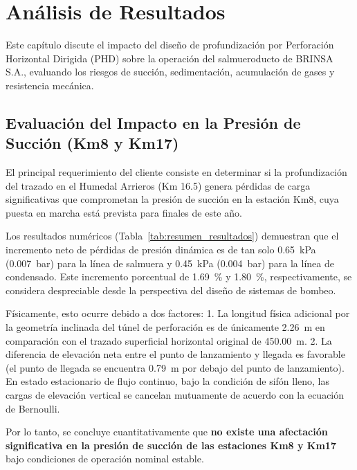 \section{Análisis de Resultados}
\label{sec:analisis}

Este capítulo discute el impacto del diseño de profundización por Perforación Horizontal Dirigida (PHD) sobre la operación del salmueroducto de BRINSA S.A., evaluando los riesgos de succión, sedimentación, acumulación de gases y resistencia mecánica.

\subsection{Evaluación del Impacto en la Presión de Succión (Km8 y Km17)}
\label{ssec:analisis_succion}

El principal requerimiento del cliente consiste en determinar si la profundización del trazado en el Humedal Arrieros (Km 16.5) genera pérdidas de carga significativas que comprometan la presión de succión en la estación Km8, cuya puesta en marcha está prevista para finales de este año.

Los resultados numéricos (Tabla~\ref{tab:resumen_resultados}) demuestran que el incremento neto de pérdidas de presión dinámica es de tan solo \SI{0.65}{\kilo\pascal} (\SI{0.007}{bar}) para la línea de salmuera y \SI{0.45}{\kilo\pascal} (\SI{0.004}{bar}) para la línea de condensado. Este incremento porcentual de \SI{1.69}{\percent} y \SI{1.80}{\percent}, respectivamente, se considera despreciable desde la perspectiva del diseño de sistemas de bombeo. 

Físicamente, esto ocurre debido a dos factores:
1. La longitud física adicional por la geometría inclinada del túnel de perforación es de únicamente \SI{2.26}{\meter} en comparación con el trazado superficial horizontal original de \SI{450.00}{\meter}.
2. La diferencia de elevación neta entre el punto de lanzamiento y llegada es favorable (el punto de llegada se encuentra \SI{0.79}{\meter} por debajo del punto de lanzamiento). En estado estacionario de flujo continuo, bajo la condición de sifón lleno, las cargas de elevación vertical se cancelan mutuamente de acuerdo con la ecuación de Bernoulli.

Por lo tanto, se concluye cuantitativamente que \textbf{no existe una afectación significativa en la presión de succión de las estaciones Km8 y Km17} bajo condiciones de operación nominal estable.

